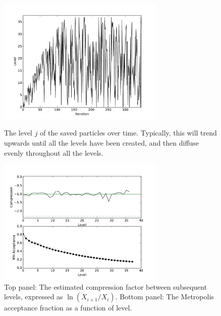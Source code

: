 \documentclass[article, nojss]{jss}
\begin{document}
\begin{figure}[ht!]
\begin{minipage}{7.5cm}
\centering
\includegraphics[width=8cm]{figures/fig1.pdf}
\caption{The level $j$ of the saved particles over time.
Typically, this will trend upwards until all the levels have
been created, and then diffuse evenly throughout all the levels.
\label{fig:fig1}}
\end{minipage}\hspace{0.5cm}
\begin{minipage}{7.5cm}
\centering
\includegraphics[width=8cm]{figures/fig2.pdf}
\caption{Top panel: The estimated compression factor between subsequent
levels, expressed as $\ln(X_{i+1}/X_{i})$. Bottom panel:
The Metropolis acceptance fraction as a function of level.
\label{fig:fig2}}
\end{minipage}
\end{figure}
\end{document}
